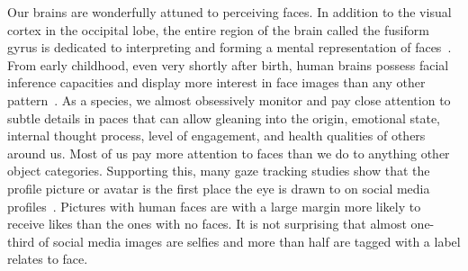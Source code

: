 \documentclass[10pt,twocolumn,letterpaper]{article}
\begin{document}
Our brains are wonderfully attuned to perceiving faces. In addition to the visual cortex in the occipital lobe, the entire region of the brain called the fusiform gyrus is dedicated to interpreting and forming a mental representation of faces~\cite{susana2018}. From early childhood, even very shortly after birth, human brains possess facial inference capacities and display more interest in face images than any other pattern~\cite{morton1991}. 
As a species, we almost obsessively monitor and pay close attention to subtle details in paces that can allow gleaning into the origin, emotional state, internal thought process, level of engagement, and health qualities of others around us. Most of us pay more attention to faces than we do to anything other object categories. Supporting this, many gaze tracking studies show that the profile picture or avatar is the first place the eye is drawn to on social media profiles~\cite{todorov2014}. Pictures with human faces are with a large margin more likely to receive likes than the ones with no faces. It is not surprising that almost one-third of social media images are selfies and more than half are tagged with a label relates to face.
\end{document}
